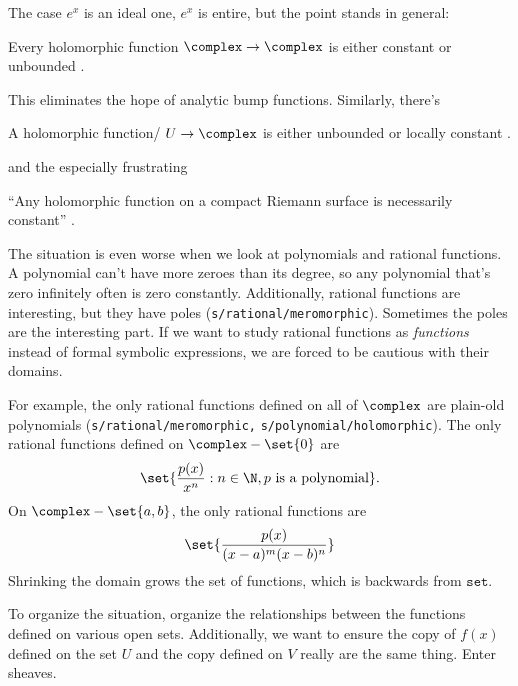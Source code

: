 \documentclass[a5paper]{scrartcl}
\def\setcat{\texttt{set}}
\begin{document}
The case \(e^x\) is an ideal one, \(e^x\) is entire, but the point stands in general:
\begin{theorem}[Liouville]
  Every holomorphic function \(\complex\to\complex\) is either constant or unbounded \cite{wiki-liouville}.
\end{theorem}
This eliminates the hope of analytic bump functions.
Similarly, there's
\begin{theorem}
  A holomorphic function\eit/ \(U \to \complex\) is either unbounded or locally constant \cite{wiki-max-mod}.
\end{theorem}
and the especially frustrating
\begin{cor}
  ``Any holomorphic function on a compact Riemann surface is necessarily constant'' \cite{wiki-liouville}.
\end{cor}

The situation is even worse when we look at polynomials and rational functions. A polynomial can't have more zeroes than its degree, so any polynomial that's zero infinitely often is zero constantly. Additionally, rational functions are interesting, but they have poles ({\footnotesize\texttt{s/rational/meromorphic}}). Sometimes the poles are the interesting part. If we want to study rational functions as \emph{functions} instead of formal symbolic expressions, we are forced to be cautious with their domains.

For example, the only rational functions defined on all of \(\complex\) are plain-old polynomials ({\footnotesize \texttt{s/rational/meromorphic,} \texttt{s/polynomial/holomorphic}}). The only rational functions defined on \(\complex-\set{0}\) are
\[
  \set{\frac{p(x)}{x^n} : n \in \N, p \text{ is a polynomial}}.
\]
On \(\complex-\set{a,b}\), the only rational functions are
\[
  \set{\frac{p(x)}{(x-a)^m(x-b)^n}}
\]
Shrinking the domain grows the set of functions, which is backwards from \(\setcat\).

To organize the situation, organize the relationships between the functions defined on various open sets. Additionally, we want to ensure the copy of \(f(x)\) defined on the set \(U\) and the copy defined on \(V\) really are the same thing. Enter sheaves.
\end{document}
